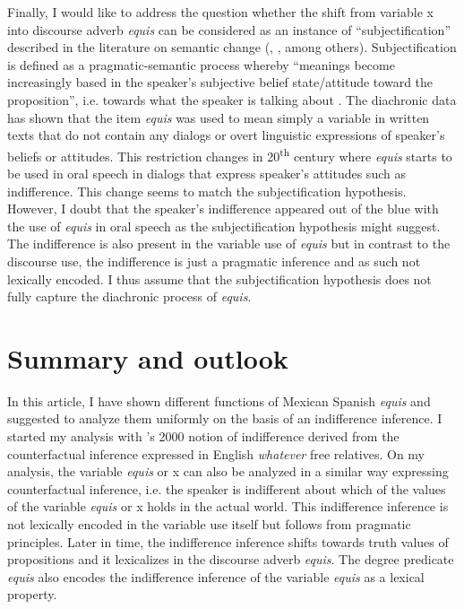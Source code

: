 \documentclass[output=paper]{langsci/langscibook}
\begin{document}
Finally, I would like to address the question whether the shift from variable x into discourse adverb \textit{equis} can be considered as an instance of “subjectification” described in the literature on semantic change (\citealt{Traugott1995}, \citealt{Company2003}, among others). Subjectification is defined as a pragmatic-semantic process whereby “meanings become increasingly based in the speaker’s subjective belief state/attitude toward the proposition”, i.e. towards what the speaker is talking about \citep[31]{Traugott1995}. The diachronic data has shown that the item \textit{equis} was used to mean simply a variable in written texts that do not contain any dialogs or overt linguistic expressions of speaker’s beliefs or attitudes. This restriction changes in 20\textsuperscript{th} century where \textit{equis} starts to be used in oral speech in dialogs that express speaker’s attitudes such as indifference. This change seems to match the subjectification hypothesis. However, I doubt that the speaker’s indifference appeared out of the blue with the use of \textit{equis} in oral speech as the subjectification hypothesis might suggest. The indifference is also present in the variable use of \textit{equis} but in contrast to the discourse use, the indifference is just a pragmatic inference and as such not lexically encoded. I thus assume that the subjectification hypothesis does not fully capture the diachronic process of \textit{equis}.

\section{Summary and outlook}\label{sec:kellert:6}
In this article, I have shown different functions of Mexican Spanish \textit{equis} and suggested to analyze them uniformly on the basis of an indifference inference. I started my analysis with \citeauthor{Fintel2000}’s 2000 notion of indifference derived from the counterfactual inference expressed in English \textit{whatever} free relatives. On my analysis, the variable \textit{equis} or x can also be analyzed in a similar way expressing counterfactual inference, i.e. the speaker is indifferent about which of the values of the variable \textit{equis} or x holds in the actual world. This indifference inference is not lexically encoded in the variable use itself but follows from pragmatic principles. Later in time, the indifference inference shifts towards truth values of propositions and it lexicalizes in the discourse adverb \textit{equis}. The degree predicate \textit{equis} also encodes the indifference inference of the variable \textit{equis} as a lexical property.
\end{document}
